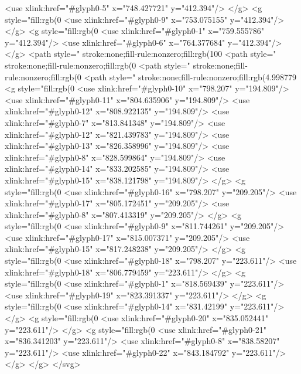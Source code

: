   <use xlink:href="#glyph0-5" x="748.427721" y="412.394"/>
</g>
<g style="fill:rgb(0%
  <use xlink:href="#glyph0-9" x="753.075155" y="412.394"/>
</g>
<g style="fill:rgb(0%
  <use xlink:href="#glyph0-1" x="759.555786" y="412.394"/>
  <use xlink:href="#glyph0-6" x="764.377684" y="412.394"/>
</g>
<path style=" stroke:none;fill-rule:nonzero;fill:rgb(100%
<path style=" stroke:none;fill-rule:nonzero;fill:rgb(0%
<path style=" stroke:none;fill-rule:nonzero;fill:rgb(0%
<path style=" stroke:none;fill-rule:nonzero;fill:rgb(4.998779%
<g style="fill:rgb(0%
  <use xlink:href="#glyph0-10" x="798.207" y="194.809"/>
  <use xlink:href="#glyph0-11" x="804.635906" y="194.809"/>
  <use xlink:href="#glyph0-12" x="808.922135" y="194.809"/>
  <use xlink:href="#glyph0-7" x="813.841348" y="194.809"/>
  <use xlink:href="#glyph0-12" x="821.439783" y="194.809"/>
  <use xlink:href="#glyph0-13" x="826.358996" y="194.809"/>
  <use xlink:href="#glyph0-8" x="828.599864" y="194.809"/>
  <use xlink:href="#glyph0-14" x="833.202585" y="194.809"/>
  <use xlink:href="#glyph0-15" x="838.121798" y="194.809"/>
</g>
<g style="fill:rgb(0%
  <use xlink:href="#glyph0-16" x="798.207" y="209.205"/>
  <use xlink:href="#glyph0-17" x="805.172451" y="209.205"/>
  <use xlink:href="#glyph0-8" x="807.413319" y="209.205"/>
</g>
<g style="fill:rgb(0%
  <use xlink:href="#glyph0-9" x="811.744261" y="209.205"/>
  <use xlink:href="#glyph0-17" x="815.007371" y="209.205"/>
  <use xlink:href="#glyph0-15" x="817.248238" y="209.205"/>
</g>
<g style="fill:rgb(0%
  <use xlink:href="#glyph0-18" x="798.207" y="223.611"/>
  <use xlink:href="#glyph0-18" x="806.779459" y="223.611"/>
</g>
<g style="fill:rgb(0%
  <use xlink:href="#glyph0-1" x="818.569439" y="223.611"/>
  <use xlink:href="#glyph0-19" x="823.391337" y="223.611"/>
</g>
<g style="fill:rgb(0%
  <use xlink:href="#glyph0-14" x="831.42199" y="223.611"/>
</g>
<g style="fill:rgb(0%
  <use xlink:href="#glyph0-20" x="835.052441" y="223.611"/>
</g>
<g style="fill:rgb(0%
  <use xlink:href="#glyph0-21" x="836.341203" y="223.611"/>
  <use xlink:href="#glyph0-8" x="838.58207" y="223.611"/>
  <use xlink:href="#glyph0-22" x="843.184792" y="223.611"/>
</g>
</g>
</svg>
